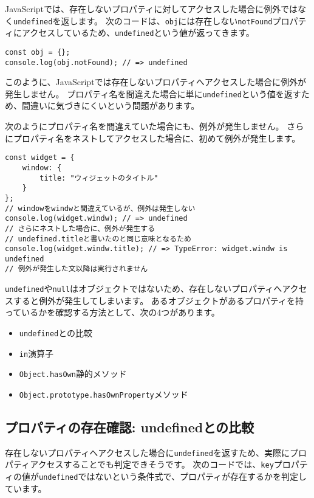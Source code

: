 JavaScriptでは、存在しないプロパティに対してアクセスした場合に例外ではなく\texttt{undefined}を返します。
次のコードは、\texttt{obj}には存在しない\texttt{notFound}プロパティにアクセスしているため、\texttt{undefined}という値が返ってきます。

\begin{lstlisting}
const obj = {};
console.log(obj.notFound); // => undefined
\end{lstlisting}

このように、JavaScriptでは存在しないプロパティへアクセスした場合に例外が発生しません。
プロパティ名を間違えた場合に単に\texttt{undefined}という値を返すため、間違いに気づきにくいという問題があります。

次のようにプロパティ名を間違えていた場合にも、例外が発生しません。
さらにプロパティ名をネストしてアクセスした場合に、初めて例外が発生します。

\begin{lstlisting}
const widget = {
    window: {
        title: "ウィジェットのタイトル"
    }
};
// windowをwindwと間違えているが、例外は発生しない
console.log(widget.windw); // => undefined
// さらにネストした場合に、例外が発生する
// undefined.titleと書いたのと同じ意味となるため
console.log(widget.windw.title); // => TypeError: widget.windw is undefined
// 例外が発生した文以降は実行されません
\end{lstlisting}

\texttt{undefined}や\texttt{null}はオブジェクトではないため、存在しないプロパティへアクセスすると例外が発生してしまいます。
あるオブジェクトがあるプロパティを持っているかを確認する方法として、次の4つがあります。

\begin{itemize}
\item
  \texttt{undefined}との比較
\item
  \texttt{in}演算子
\item
  \texttt{Object.hasOwn}静的メソッド\,\protect{}
\item
  \texttt{Object.prototype.hasOwnProperty}メソッド
\end{itemize}

\hypertarget{compare-to-undefined}{%
\subsection{プロパティの存在確認:
undefinedとの比較}\label{compare-to-undefined}}

存在しないプロパティへアクセスした場合に\texttt{undefined}を返すため、実際にプロパティアクセスすることでも判定できそうです。
次のコードでは、\texttt{key}プロパティの値が\texttt{undefined}ではないという条件式で、プロパティが存在するかを判定しています。


